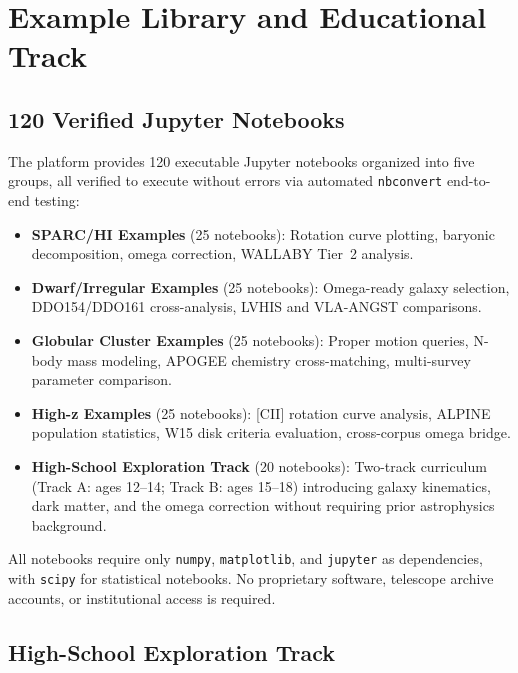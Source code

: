 \documentclass[twocolumn]{aastex631}
\begin{document}
\section{Example Library and Educational Track}
\label{sec:examples}

\subsection{120 Verified Jupyter Notebooks}
\label{sec:notebooks}

The platform provides 120 executable Jupyter notebooks organized into five
groups, all verified to execute without errors via automated \texttt{nbconvert}
end-to-end testing:

\begin{itemize}
\item \textbf{SPARC/HI Examples} (25 notebooks): Rotation curve plotting,
      baryonic decomposition, omega correction, WALLABY Tier~2 analysis.
\item \textbf{Dwarf/Irregular Examples} (25 notebooks): Omega-ready galaxy
      selection, DDO154/DDO161 cross-analysis, LVHIS and VLA-ANGST comparisons.
\item \textbf{Globular Cluster Examples} (25 notebooks): Proper motion queries,
      N-body mass modeling, APOGEE chemistry cross-matching, multi-survey
      parameter comparison.
\item \textbf{High-z Examples} (25 notebooks): [CII] rotation curve analysis,
      ALPINE population statistics, W15 disk criteria evaluation, cross-corpus
      omega bridge.
\item \textbf{High-School Exploration Track} (20 notebooks): Two-track
      curriculum (Track A: ages 12--14; Track B: ages 15--18) introducing
      galaxy kinematics, dark matter, and the omega correction without
      requiring prior astrophysics background.
\end{itemize}

All notebooks require only \texttt{numpy}, \texttt{matplotlib}, and
\texttt{jupyter} as dependencies, with \texttt{scipy} for statistical notebooks.
No proprietary software, telescope archive accounts, or institutional access
is required.

\subsection{High-School Exploration Track}
\label{sec:hs}
\end{document}
